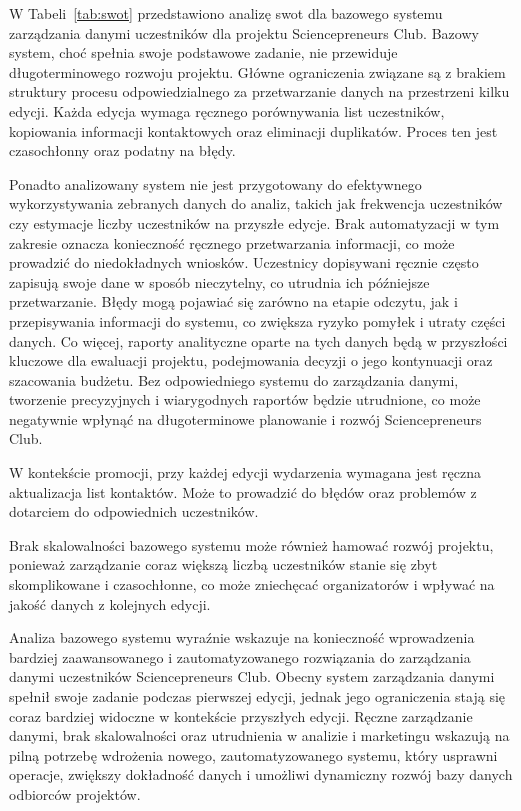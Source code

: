  W Tabeli~\ref{tab:swot} przedstawiono analizę \gls{swot} dla bazowego systemu zarządzania danymi uczestników dla projektu Sciencepreneurs Club.
Bazowy system, choć spełnia swoje podstawowe zadanie, nie przewiduje długoterminowego rozwoju projektu. Główne ograniczenia związane są z brakiem struktury procesu odpowiedzialnego za przetwarzanie danych na przestrzeni kilku edycji. Każda edycja wymaga ręcznego porównywania list uczestników, kopiowania informacji kontaktowych oraz eliminacji duplikatów. Proces ten jest czasochłonny oraz podatny na błędy.

\break
Ponadto analizowany system nie jest przygotowany do efektywnego wykorzystywania zebranych danych do analiz, takich jak frekwencja uczestników czy estymacje liczby uczestników na przyszłe edycje. Brak automatyzacji w tym zakresie oznacza konieczność ręcznego przetwarzania informacji, co może prowadzić do niedokładnych wniosków.  Uczestnicy dopisywani ręcznie często zapisują swoje dane w sposób nieczytelny, co utrudnia ich późniejsze przetwarzanie. Błędy mogą pojawiać się zarówno na etapie odczytu, jak i przepisywania informacji do systemu, co zwiększa ryzyko pomyłek i utraty części danych. Co więcej, raporty analityczne oparte na tych danych będą w przyszłości kluczowe dla ewaluacji projektu, podejmowania decyzji o jego kontynuacji oraz szacowania budżetu. Bez odpowiedniego systemu do zarządzania danymi, tworzenie precyzyjnych i wiarygodnych raportów będzie utrudnione, co może negatywnie wpłynąć na długoterminowe planowanie i rozwój Sciencepreneurs Club. 

W kontekście promocji, przy każdej edycji wydarzenia wymagana jest ręczna aktualizacja list kontaktów. Może to prowadzić do błędów oraz problemów z dotarciem do odpowiednich uczestników.

Brak skalowalności bazowego systemu może również hamować rozwój projektu, ponieważ zarządzanie coraz większą liczbą uczestników stanie się zbyt skomplikowane i czasochłonne, co może zniechęcać organizatorów i wpływać na jakość danych z kolejnych edycji.

Analiza bazowego systemu wyraźnie wskazuje na konieczność wprowadzenia bardziej zaawansowanego i zautomatyzowanego rozwiązania do zarządzania danymi uczestników Sciencepreneurs Club. Obecny system zarządzania danymi spełnił swoje zadanie podczas pierwszej edycji, jednak jego ograniczenia stają się coraz bardziej widoczne w kontekście przyszłych edycji. Ręczne zarządzanie danymi, brak skalowalności oraz utrudnienia w analizie i marketingu wskazują na pilną potrzebę wdrożenia nowego, zautomatyzowanego systemu, który usprawni operacje, zwiększy dokładność danych i umożliwi dynamiczny rozwój bazy danych odbiorców projektów.

